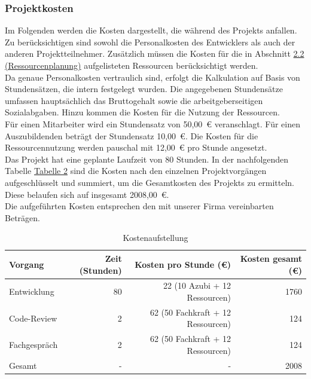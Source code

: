 \documentclass[a4paper,12pt]{article}
\begin{document}
\subsubsection{Projektkosten}
Im Folgenden werden die Kosten dargestellt, die während des Projekts anfallen. Zu berücksichtigen sind sowohl die Personalkosten des Entwicklers als auch der anderen Projektteilnehmer. Zusätzlich müssen die Kosten für die in Abschnitt \hyperref[sec:ressourcenplanung]{2.2 (Ressourcenplanung)} aufgelisteten Ressourcen berücksichtigt werden.\\
Da genaue Personalkosten vertraulich sind, erfolgt die Kalkulation auf Basis von Stundensätzen, die intern festgelegt wurden. Die angegebenen Stundensätze umfassen hauptsächlich das Bruttogehalt sowie die arbeitgeberseitigen Sozialabgaben. Hinzu kommen die Kosten für die Nutzung der Ressourcen.\\
Für einen Mitarbeiter wird ein Stundensatz von 50,00~€ veranschlagt. Für einen Auszubildenden beträgt der Stundensatz 10,00~€. Die Kosten für die Ressourcennutzung werden pauschal mit 12,00~€ pro Stunde angesetzt.\\
Das Projekt hat eine geplante Laufzeit von 80 Stunden. In der nachfolgenden Tabelle \hyperlink{Kostenaufstellung}{Tabelle 2} sind die Kosten nach den einzelnen Projektvorgängen aufgeschlüsselt und summiert, um die Gesamtkosten des Projekts zu ermitteln. Diese belaufen sich auf insgesamt 2008,00~€.\\
Die aufgeführten Kosten entsprechen den mit unserer Firma vereinbarten Beträgen.

\hypertarget{Kostenaufstellung}{}
\begin{table}[h]
\centering
\begin{tabular}{|l|r|r|r|}
\hline
\rowcolor{gray}
\textbf{Vorgang} & \textbf{Zeit (Stunden)} & \textbf{Kosten pro Stunde (€)} & \textbf{Kosten gesamt (€)} \\
\hline
Entwicklung & 80 & 22 (10 Azubi + 12 Ressourcen) & 1760 \\
\hline
Code-Review & 2 & 62 (50 Fachkraft + 12 Ressourcen) & 124 \\
\hline
Fachgespräch & 2 & 62 (50 Fachkraft + 12 Ressourcen) & 124 \\
\hline
\hline
Gesamt & - & - & 2008 \\
\hline
\end{tabular}
\caption{Kostenaufstellung}
\label{tab:Kostenaufstellung}
\end{table}
\end{document}
